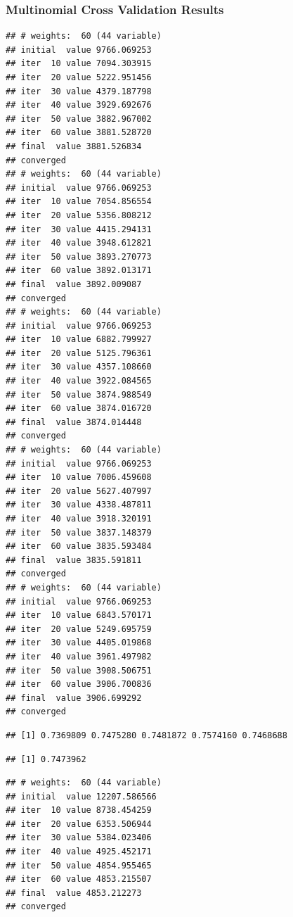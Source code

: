 \documentclass[
]{article}
\begin{document}
\hypertarget{multinomial-cross-validation-results}{%
\subsubsection{Multinomial Cross Validation
Results}\label{multinomial-cross-validation-results}}

\begin{verbatim}
## # weights:  60 (44 variable)
## initial  value 9766.069253 
## iter  10 value 7094.303915
## iter  20 value 5222.951456
## iter  30 value 4379.187798
## iter  40 value 3929.692676
## iter  50 value 3882.967002
## iter  60 value 3881.528720
## final  value 3881.526834 
## converged
## # weights:  60 (44 variable)
## initial  value 9766.069253 
## iter  10 value 7054.856554
## iter  20 value 5356.808212
## iter  30 value 4415.294131
## iter  40 value 3948.612821
## iter  50 value 3893.270773
## iter  60 value 3892.013171
## final  value 3892.009087 
## converged
## # weights:  60 (44 variable)
## initial  value 9766.069253 
## iter  10 value 6882.799927
## iter  20 value 5125.796361
## iter  30 value 4357.108660
## iter  40 value 3922.084565
## iter  50 value 3874.988549
## iter  60 value 3874.016720
## final  value 3874.014448 
## converged
## # weights:  60 (44 variable)
## initial  value 9766.069253 
## iter  10 value 7006.459608
## iter  20 value 5627.407997
## iter  30 value 4338.487811
## iter  40 value 3918.320191
## iter  50 value 3837.148379
## iter  60 value 3835.593484
## final  value 3835.591811 
## converged
## # weights:  60 (44 variable)
## initial  value 9766.069253 
## iter  10 value 6843.570171
## iter  20 value 5249.695759
## iter  30 value 4405.019868
## iter  40 value 3961.497982
## iter  50 value 3908.506751
## iter  60 value 3906.700836
## final  value 3906.699292 
## converged
\end{verbatim}

\begin{verbatim}
## [1] 0.7369809 0.7475280 0.7481872 0.7574160 0.7468688
\end{verbatim}

\begin{verbatim}
## [1] 0.7473962
\end{verbatim}

\begin{verbatim}
## # weights:  60 (44 variable)
## initial  value 12207.586566 
## iter  10 value 8738.454259
## iter  20 value 6353.506944
## iter  30 value 5384.023406
## iter  40 value 4925.452171
## iter  50 value 4854.955465
## iter  60 value 4853.215507
## final  value 4853.212273 
## converged
\end{verbatim}
\end{document}
